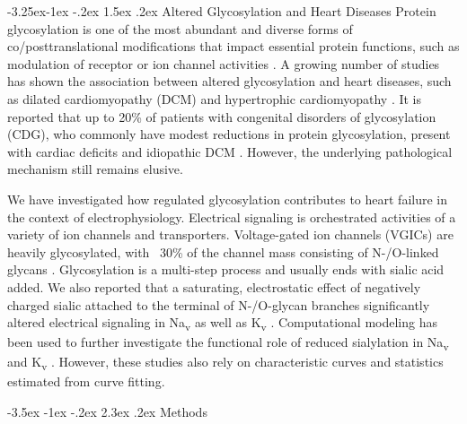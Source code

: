 \documentclass[11pt]{article}
\makeatletter
\renewcommand\section{\@startsection {section}{1}{\z@}%
                                   {-3.5ex \@plus -1ex \@minus -.2ex}%
                                   {2.3ex \@plus.2ex}%
                                   {\normalfont\fontfamily{phv}\fontsize{16}{19}\bfseries}}
\renewcommand\subsection{\@startsection{subsection}{2}{\z@}%
                                     {-3.25ex\@plus -1ex \@minus -.2ex}%
                                     {1.5ex \@plus .2ex}%
                                     {\normalfont\fontfamily{phv}\fontsize{14}{17}\bfseries}}
\makeatother
\begin{document}
\subsection{Altered Glycosylation and Heart Diseases}
Protein glycosylation is one of the most abundant and diverse forms of co/posttranslational modifications that impact essential protein functions, such as modulation of receptor or ion channel activities \citep{ohtsubo2006glycosylation,ednie2012modulation}. A growing number of studies has shown the association between altered glycosylation and heart diseases, such as dilated cardiomyopathy (DCM) and hypertrophic cardiomyopathy \citep{ohtsubo2006glycosylation,ednie2019reduced2}. It is reported that up to 20\% of patients with congenital disorders of glycosylation (CDG), who commonly have modest reductions in protein glycosylation, present with cardiac deficits and idiopathic DCM \citep{marques2017cardiac}. However, the underlying pathological mechanism still remains elusive. 

We have investigated how regulated glycosylation contributes to heart failure in the context of electrophysiology. Electrical signaling is orchestrated activities of a variety of ion channels and transporters. Voltage-gated ion channels (VGICs) are heavily glycosylated, with ~30\% of the channel mass consisting of N-/O-linked glycans \citep{ednie2012modulation}. Glycosylation is a multi-step process and usually ends with sialic acid added. We also reported that a saturating, electrostatic effect of negatively charged sialic attached to the terminal of N-/O-glycan branches significantly altered electrical signaling in Na\textsubscript{v} \citep{ednie2013sialicNav1,ednie2015sialicNav2} as well as K\textsubscript{v} \citep{ednie2015sialicKv}. Computational modeling has been used to further investigate the functional role of reduced sialylation in Na\textsubscript{v} and K\textsubscript{v} \citep{du2015statistical, du2017silico}. However, these studies also rely on characteristic curves and statistics estimated from curve fitting. 

\section{Methods}
\end{document}
